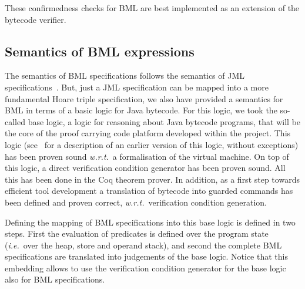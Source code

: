 These confirmedness checks for BML are best implemented as an
extension of the bytecode verifier.
 



\subsection{Semantics of BML expressions}

The semantics of BML specifications follows the semantics of JML
specifications~\cite{JMLReferenceManual05}. But, just a JML
specification can be mapped into a more fundamental Hoare triple
specification, we also have provided a semantics for BML in terms of a
basic logic for Java bytecode. For this logic, we took the so-called
\mobius base logic, a logic for reasoning about Java bytecode
programs, that will be the core of the proof carrying code platform
developed within the project. This logic (see~\cite{BeringerH06} for a
description of an earlier version of this logic, without exceptions)
has been proven sound \emph{w.r.t.}\ a formalisation of the virtual
machine. On top of this logic, a direct verification condition
generator has been proven sound. All this has been done in the Coq
theorem prover. In addition, as a first step towards efficient tool
development a translation of bytecode into guarded commands has been
defined and proven correct, \emph{w.r.t.}\ verification condition
generation. 

Defining the mapping of BML specifications into this \mobius base
logic is defined in two steps. First the evaluation of predicates is
defined over the program state (\emph{i.e.}\ over the heap, store and
operand stack), and second the complete BML specifications are
translated into judgements of the \mobius base logic. Notice that this
embedding allows to use the verification condition generator for the
\mobius base logic also for BML specifications.

